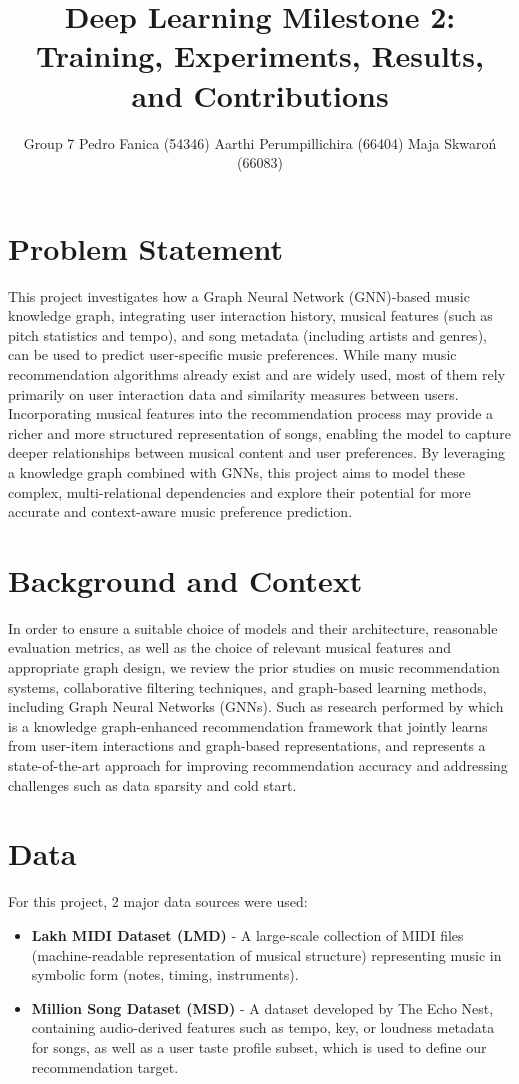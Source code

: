 \documentclass[10pt,twocolumn,letterpaper]{article}
\title{Deep Learning Milestone 2: Training, Experiments, Results, and Contributions}
\author{Group 7 \quad Pedro Fanica (54346) \quad Aarthi Perumpillichira (66404) \quad Maja Skwaroń (66083)}
\begin{document}
\maketitle

\section{Problem Statement}
This project investigates how a Graph Neural Network (GNN)-based music knowledge graph, integrating user interaction history, musical features (such as pitch statistics and tempo), and song metadata (including artists and genres), can be used to predict user-specific music preferences. 
While many music recommendation algorithms already exist and are widely used, most of them rely primarily on user interaction data and similarity measures between users. Incorporating musical features into the recommendation process may provide a richer and more structured representation of songs, enabling the model to capture deeper relationships between musical content and user preferences. By leveraging a knowledge graph combined with GNNs, this project aims to model these complex, multi-relational dependencies and explore their potential for more accurate and context-aware music preference prediction.

\section{Background and Context}
In order to ensure a suitable choice of models and their architecture, reasonable evaluation metrics, as well as the choice of relevant musical features and appropriate graph design, we review the prior studies on music recommendation systems, collaborative filtering techniques, and graph-based learning methods, including Graph Neural Networks (GNNs). Such as research performed  by \cite{liu2024kgmusic} which is a knowledge graph-enhanced recommendation framework that jointly learns from user-item interactions and graph-based representations, and represents a state-of-the-art approach for improving recommendation accuracy and addressing challenges such as data sparsity and cold start.

\section{Data}
For this project, 2 major data sources were used:
\begin{itemize}\setlength\itemsep{0pt}
    \item \textbf{Lakh MIDI Dataset (LMD)} - A large-scale collection of MIDI files (machine-readable representation of musical structure) representing music in symbolic form (notes, timing, instruments).
    \item \textbf{Million Song Dataset (MSD)} - A dataset developed by The Echo Nest, containing audio-derived features such as tempo, key, or loudness metadata for songs, as well as a user taste profile subset, which is used to define our recommendation target. 
\end{itemize}
\end{document}
